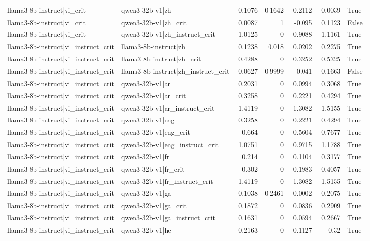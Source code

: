 \begin{table}
\begin{tabular}{l l r r r r l}
llama3-8b-instruct|vi_crit & qwen3-32b-v1|zh & -0.1076 & 0.1642 & -0.2112 & -0.0039 & True \\
llama3-8b-instruct|vi_crit & qwen3-32b-v1|zh_crit & 0.0087 & 1 & -0.095 & 0.1123 & False \\
llama3-8b-instruct|vi_crit & qwen3-32b-v1|zh_instruct_crit & 1.0125 & 0 & 0.9088 & 1.1161 & True \\
llama3-8b-instruct|vi_instruct_crit & llama3-8b-instruct|zh & 0.1238 & 0.018 & 0.0202 & 0.2275 & True \\
llama3-8b-instruct|vi_instruct_crit & llama3-8b-instruct|zh_crit & 0.4288 & 0 & 0.3252 & 0.5325 & True \\
llama3-8b-instruct|vi_instruct_crit & llama3-8b-instruct|zh_instruct_crit & 0.0627 & 0.9999 & -0.041 & 0.1663 & False \\
llama3-8b-instruct|vi_instruct_crit & qwen3-32b-v1|ar & 0.2031 & 0 & 0.0994 & 0.3068 & True \\
llama3-8b-instruct|vi_instruct_crit & qwen3-32b-v1|ar_crit & 0.3258 & 0 & 0.2221 & 0.4294 & True \\
llama3-8b-instruct|vi_instruct_crit & qwen3-32b-v1|ar_instruct_crit & 1.4119 & 0 & 1.3082 & 1.5155 & True \\
llama3-8b-instruct|vi_instruct_crit & qwen3-32b-v1|eng & 0.3258 & 0 & 0.2221 & 0.4294 & True \\
llama3-8b-instruct|vi_instruct_crit & qwen3-32b-v1|eng_crit & 0.664 & 0 & 0.5604 & 0.7677 & True \\
llama3-8b-instruct|vi_instruct_crit & qwen3-32b-v1|eng_instruct_crit & 1.0751 & 0 & 0.9715 & 1.1788 & True \\
llama3-8b-instruct|vi_instruct_crit & qwen3-32b-v1|fr & 0.214 & 0 & 0.1104 & 0.3177 & True \\
llama3-8b-instruct|vi_instruct_crit & qwen3-32b-v1|fr_crit & 0.302 & 0 & 0.1983 & 0.4057 & True \\
llama3-8b-instruct|vi_instruct_crit & qwen3-32b-v1|fr_instruct_crit & 1.4119 & 0 & 1.3082 & 1.5155 & True \\
llama3-8b-instruct|vi_instruct_crit & qwen3-32b-v1|ga & 0.1038 & 0.2461 & 0.0002 & 0.2075 & True \\
llama3-8b-instruct|vi_instruct_crit & qwen3-32b-v1|ga_crit & 0.1872 & 0 & 0.0836 & 0.2909 & True \\
llama3-8b-instruct|vi_instruct_crit & qwen3-32b-v1|ga_instruct_crit & 0.1631 & 0 & 0.0594 & 0.2667 & True \\
llama3-8b-instruct|vi_instruct_crit & qwen3-32b-v1|he & 0.2163 & 0 & 0.1127 & 0.32 & True \\

\end{tabular}
\end{table}
